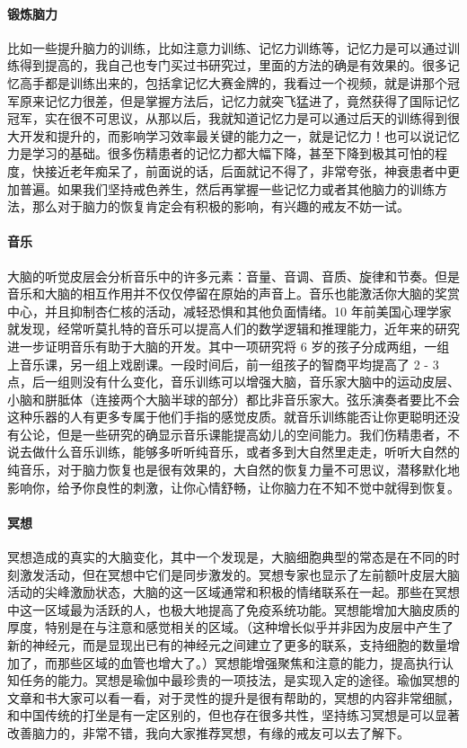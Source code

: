 \documentclass{ctexart}
\begin{document}
\paragraph{锻炼脑力} 比如一些提升脑力的训练，比如注意力训练、记忆力训练等，记忆力是可以通过训练得到提高的，我自己也专门买过书研究过，里面的方法的确是有效果的。很多记忆高手都是训练出来的，包括拿记忆大赛金牌的，我看过一个视频，就是讲那个冠军原来记忆力很差，但是掌握方法后，记忆力就突飞猛进了，竟然获得了国际记忆冠军，实在很不可思议，从那以后，我就知道记忆力是可以通过后天的训练得到很大开发和提升的，而影响学习效率最关键的能力之一，就是记忆力！也可以说记忆力是学习的基础。很多伤精患者的记忆力都大幅下降，甚至下降到极其可怕的程度，快接近老年痴呆了，前面说的话，后面就记不得了，非常夸张，神衰患者中更加普遍。如果我们坚持戒色养生，然后再掌握一些记忆力或者其他脑力的训练方法，那么对于脑力的恢复肯定会有积极的影响，有兴趣的戒友不妨一试。

\paragraph{音乐} 大脑的听觉皮层会分析音乐中的许多元素：音量、音调、音质、旋律和节奏。但是音乐和大脑的相互作用并不仅仅停留在原始的声音上。音乐也能激活你大脑的奖赏中心，并且抑制杏仁核的活动，减轻恐惧和其他负面情绪。10 年前美国心理学家就发现，经常听莫扎特的音乐可以提高人们的数学逻辑和推理能力，近年来的研究进一步证明音乐有助于大脑的开发。其中一项研究将 6 岁的孩子分成两组，一组上音乐课，另一组上戏剧课。一段时间后，前一组孩子的智商平均提高了 2 - 3 点，后一组则没有什么变化，音乐训练可以增强大脑，音乐家大脑中的运动皮层、小脑和胼胝体（连接两个大脑半球的部分）都比非音乐家大。弦乐演奏者要比不会这种乐器的人有更多专属于他们手指的感觉皮质。就音乐训练能否让你更聪明还没有公论，但是一些研究的确显示音乐课能提高幼儿的空间能力。我们伤精患者，不说去做什么音乐训练，能够多听听纯音乐，或者多到大自然里走走，听听大自然的纯音乐，对于脑力恢复也是很有效果的，大自然的恢复力量不可思议，潜移默化地影响你，给予你良性的刺激，让你心情舒畅，让你脑力在不知不觉中就得到恢复。

\paragraph{冥想} 冥想造成的真实的大脑变化，其中一个发现是，大脑细胞典型的常态是在不同的时刻激发活动，但在冥想中它们是同步激发的。冥想专家也显示了左前额叶皮层大脑活动的尖峰激励状态，大脑的这一区域通常和积极的情绪联系在一起。那些在冥想中这一区域最为活跃的人，也极大地提高了免疫系统功能。冥想能增加大脑皮质的厚度，特别是在与注意和感觉相关的区域。（这种增长似乎并非因为皮层中产生了新的神经元，而是显现出已有的神经元之间建立了更多的联系，支持细胞的数量增加了，而那些区域的血管也增大了。）冥想能增强聚焦和注意的能力，提高执行认知任务的能力。冥想是瑜伽中最珍贵的一项技法，是实现入定的途径。瑜伽冥想的文章和书大家可以看一看，对于灵性的提升是很有帮助的，冥想的内容非常细腻，和中国传统的打坐是有一定区别的，但也存在很多共性，坚持练习冥想是可以显著改善脑力的，非常不错，我向大家推荐冥想，有缘的戒友可以去了解下。
\end{document}
